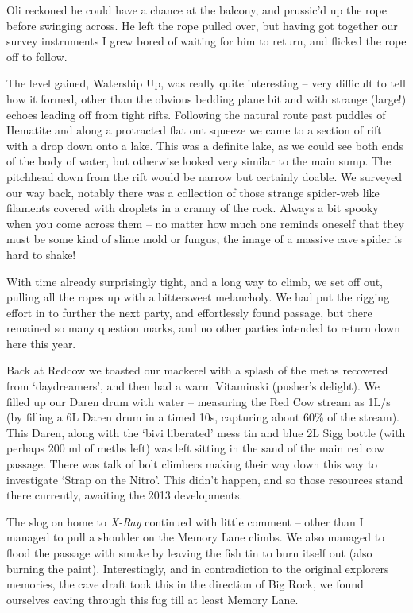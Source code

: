Oli reckoned he could have a chance at the balcony, and prussic'd up the
rope before swinging across. He left the rope pulled over, but having
got together our survey instruments I grew bored of waiting for him to
return, and flicked the rope off to follow.

The level gained, Watership Up, was really quite interesting -- very
difficult to tell how it formed, other than the obvious bedding plane
bit and with strange (large!) echoes leading off from tight rifts.
Following the natural route past puddles of Hematite and along a
protracted flat out squeeze we came to a section of rift with a drop
down onto a lake. This was a definite lake, as we could see both ends of
the body of water, but otherwise looked very similar to the main sump.
The pitchhead down from the rift would be narrow but certainly doable.
We surveyed our way back, notably there was a collection of those
strange spider-web like filaments covered with droplets in a cranny of
the rock. Always a bit spooky when you come across them -- no matter how
much one reminds oneself that they must be some kind of slime mold or
fungus, the image of a massive cave spider is hard to shake!

With time already surprisingly tight, and a long way to climb, we set
off out, pulling all the ropes up with a bittersweet melancholy. We had
put the rigging effort in to further the next party, and effortlessly
found passage, but there remained so many question marks, and no other
parties intended to return down here this year.

Back at Redcow we toasted our mackerel with a splash of the meths
recovered from `daydreamers', and then had a warm Vitaminski (pusher's
delight). We filled up our Daren drum with water -- measuring the Red
Cow stream as 1L/s (by filling a 6L Daren drum in a timed 10s, capturing
about 60\% of the stream). This Daren, along with the `bivi liberated'
mess tin and blue 2L Sigg bottle (with perhaps 200 ml of meths left) was
left sitting in the sand of the main red cow passage. There was talk of
bolt climbers making their way down this way to investigate `Strap on
the Nitro'. This didn't happen, and so those resources stand there
currently, awaiting the 2013 developments.

The slog on home to \emph{X-Ray} continued with little comment -- other
than I managed to pull a shoulder on the Memory Lane climbs. We also
managed to flood the passage with smoke by leaving the fish tin to burn
itself out (also burning the paint). Interestingly, and in contradiction
to the original explorers memories, the cave draft took this in the
direction of Big Rock, we found ourselves caving through this fug till
at least Memory Lane.

